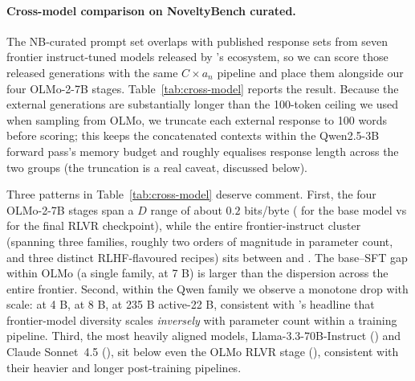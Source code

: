 \paragraph{Cross-model comparison on NoveltyBench curated.} The NB-curated prompt set overlaps with published response sets from seven frontier instruct-tuned models released by \citet{zhang2025noveltybench}'s ecosystem, so we can score those released generations with the same $C \times a_n$ pipeline and place them alongside our four OLMo-2-7B stages. Table~\ref{tab:cross-model} reports the result. Because the external generations are substantially longer than the 100-token ceiling we used when sampling from OLMo, we truncate each external response to 100 words before scoring; this keeps the concatenated contexts within the Qwen2.5-3B forward pass's memory budget and roughly equalises response length across the two groups (the truncation is a real caveat, discussed below).

\begin{table}[h]
\centering
\caption{Cross-model $D = C \times a_n$ (per-byte) on the \olmoNbCuratedN{} NoveltyBench curated prompts, $K=10$ responses per prompt. Our four OLMo-2-7B stages were sampled for this paper (temperature 1, $\texttt{max\_new\_tokens}{=}100$); the external frontier-model responses are the released 10-sample generations from \citet{zhang2025noveltybench}'s ecosystem (\texttt{alon-albalak/*-noveltybench-responses}), truncated to 100 words before scoring. All runs share the same Qwen2.5-3B scorer $\theta$ and 25 permutations.}
\label{tab:cross-model}
\small
{}
\end{table}

Three patterns in Table~\ref{tab:cross-model} deserve comment. First, the four OLMo-2-7B stages span a $D$ range of about $0.2$ bits/byte (\crossModelOlmoBase{} for the base model vs \crossModelOlmoInstruct{} for the final RLVR checkpoint), while the entire frontier-instruct cluster (spanning three families, roughly two orders of magnitude in parameter count, and three distinct RLHF-flavoured recipes) sits between \crossModelLlamaThreeThreeSeventyB{} and \crossModelGptFive{}. The base--SFT gap within OLMo (a single family, at 7 B) is larger than the dispersion across the entire frontier. Second, within the Qwen family we observe a monotone drop with scale: \crossModelQwenFourB{} at 4 B, \crossModelQwenEightB{} at 8 B, \crossModelQwenTwoThreeFiveB{} at 235 B active-22 B, consistent with \citet{zhang2025noveltybench}'s headline that frontier-model diversity scales \emph{inversely} with parameter count within a training pipeline. Third, the most heavily aligned models, Llama-3.3-70B-Instruct (\crossModelLlamaThreeThreeSeventyB{}) and Claude Sonnet~4.5 (\crossModelClaudeSonnetFourFive{}), sit below even the OLMo RLVR stage (\crossModelOlmoInstruct{}), consistent with their heavier and longer post-training pipelines.

